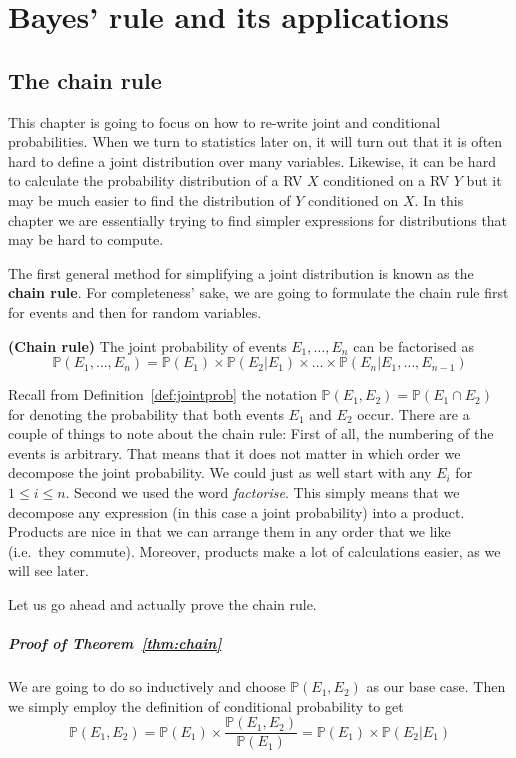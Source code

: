 
\setcounter{chapter}{3}
\chapter{Bayes' rule and its applications}

\section{The chain rule}

This chapter is going to focus on how to re-write joint and conditional probabilities. When we turn to statistics later on, it will
turn out that it is often hard to define a joint distribution over many variables. Likewise, it can be hard to calculate 
the probability distribution of a RV $ X $ conditioned on a RV $ Y $ but it may be much easier to find the distribution of $ Y $
conditioned on $ X $. In this chapter we are essentially trying to find simpler expressions for distributions that may be hard to
compute.

The first general method for simplifying a joint distribution is known as the \textbf{chain rule}. For completeness' sake, we are going to formulate the chain rule first for events and then for random variables.

\begin{Theorem}{\textbf{(Chain rule)}} \label{thm:chain}
The joint probability of events $ E_{1}, \ldots, E_{n} $ can be factorised as
$$ \mathbb{P}(E_{1}, \ldots, E_{n}) = \mathbb{P}(E_{1}) \times \mathbb{P}(E_{2}|E_{1}) \times \ldots \times \mathbb{P}(E_{n}|E_{1}, \ldots, E_{n-1}) $$
\end{Theorem} 
Recall from Definition~\ref{def:jointprob} the notation $\mathbb{P}(E_1,E_2) = \mathbb{P}(E_1 \cap E_2)$ for denoting the probability that both events $E_1$ and $E_2$ occur. There are a couple of things to note about the chain rule: First of all, the numbering of the events is arbitrary. That means that it does not matter in which
order we decompose the joint probability. We could just as well start with any $ E_{i} $ for $ 1 \leq i \leq n $. Second we used the 
word \textit{factorise}. This simply means that we decompose any expression (in this case a joint probability) into a product. Products are
nice in that we can arrange them in any order that we like (i.e.\ they commute). Moreover, products make a lot of calculations easier, as we will
see later.

Let us go ahead and actually prove the chain rule. 
\paragraph{Proof of Theorem~\ref{thm:chain}} We are going to do so inductively and choose $ \mathbb{P}(E_{1}, E_{2}) $ as our
base case. Then we simply employ the definition of conditional probability to get
\begin{equation}
\mathbb{P}(E_{1}, E_{2}) = \mathbb{P}(E_{1}) \times \dfrac{\mathbb{P}(E_{1}, E_{2})}{\mathbb{P}(E_{1})} = \mathbb{P}(E_{1}) \times \mathbb{P}(E_{2}|E_{1})
\end{equation}


